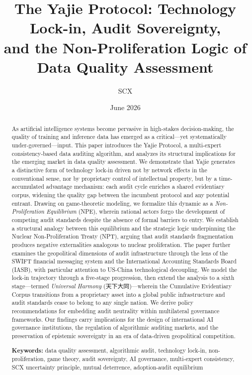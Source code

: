 \documentclass[12pt,a4paper]{ctexart}
\title{The Yajie Protocol: Technology Lock-in, Audit Sovereignty,\\and the Non-Proliferation Logic of Data Quality Assessment}
\author{SCX}
\date{June 2026}
\theoremstyle{definition}
\theoremstyle{remark}
\begin{document}
\maketitle

\begin{abstract}
As artificial intelligence systems become pervasive in high-stakes decision-making, the quality of training and inference data has emerged as a critical—yet systematically under-governed—input. This paper introduces the Yajie Protocol, a multi-expert consistency-based data auditing algorithm, and analyzes its structural implications for the emerging market in data quality assessment. We demonstrate that Yajie generates a distinctive form of technology lock-in driven not by network effects in the conventional sense, nor by proprietary control of intellectual property, but by a time-accumulated advantage mechanism: each audit cycle enriches a shared evidentiary corpus, widening the quality gap between the incumbent protocol and any potential entrant. Drawing on game-theoretic modeling, we formalize this dynamic as a \textit{Non-Proliferation Equilibrium} (NPE), wherein rational actors forgo the development of competing audit standards despite the absence of formal barriers to entry. We establish a structural analogy between this equilibrium and the strategic logic underpinning the Nuclear Non-Proliferation Treaty (NPT), arguing that audit standards fragmentation produces negative externalities analogous to nuclear proliferation. The paper further examines the geopolitical dimensions of audit infrastructure through the lens of the SWIFT financial messaging system and the International Accounting Standards Board (IASB), with particular attention to US-China technological decoupling. We model the lock-in trajectory through a five-stage progression, then extend the analysis to a sixth stage—termed \textit{Universal Harmony} (天下大同)—wherein the Cumulative Evidentiary Corpus transitions from a proprietary asset into a global public infrastructure and audit standards cease to belong to any single nation. We derive policy recommendations for embedding audit neutrality within multilateral governance frameworks. Our findings carry implications for the design of international AI governance institutions, the regulation of algorithmic auditing markets, and the preservation of epistemic sovereignty in an era of data-driven geopolitical competition.

\bigskip
\noindent\textbf{Keywords:} data quality assessment, algorithmic audit, technology lock-in, non-proliferation, game theory, audit sovereignty, AI governance, multi-expert consistency, SCX uncertainty principle, mutual deterrence, adoption-audit equilibrium
\end{abstract}
\end{document}
